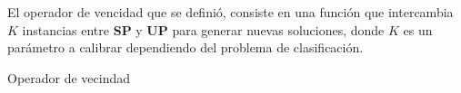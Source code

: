 \documentclass{ci5652}
\begin{document}
El operador de vencidad que se definió, consiste en una función que intercambia $K$ instancias entre \textbf{SP} y \textbf{UP} para generar nuevas soluciones, donde $K$ es un parámetro a calibrar dependiendo del problema de clasificación.

\begin{algorithm}
 \DontPrintSemicolon
 \vspace*{0.1cm}
 \vspace*{0.1cm}
 \caption{Operador de vecindad}
\end{algorithm}
\end{document}
